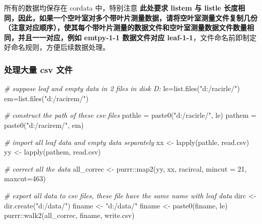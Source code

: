\documentclass[
]{krantz}
\makeatletter
\newenvironment{Shaded}{\begin{snugshade}}{\end{snugshade}}
\newcommand{\AttributeTok}[1]{\textcolor[rgb]{0.77,0.63,0.00}{#1}}
\newcommand{\CommentTok}[1]{\textcolor[rgb]{0.56,0.35,0.01}{\textit{#1}}}
\newcommand{\DecValTok}[1]{\textcolor[rgb]{0.00,0.00,0.81}{#1}}
\newcommand{\FunctionTok}[1]{\textcolor[rgb]{0.00,0.00,0.00}{#1}}
\newcommand{\NormalTok}[1]{#1}
\newcommand{\OtherTok}[1]{\textcolor[rgb]{0.56,0.35,0.01}{#1}}
\newcommand{\SpecialCharTok}[1]{\textcolor[rgb]{0.00,0.00,0.00}{#1}}
\newcommand{\StringTok}[1]{\textcolor[rgb]{0.31,0.60,0.02}{#1}}
\newenvironment{kframe}{%
\medskip{}
\setlength{\fboxsep}{.8em}
 \def\at@end@of@kframe{}%
 \ifinner\ifhmode%
  \def\at@end@of@kframe{\end{minipage}}%
  \begin{minipage}{\columnwidth}%
 \fi\fi%
 \def\FrameCommand##1{\hskip\@totalleftmargin \hskip-\fboxsep
 \colorbox{shadecolor}{##1}\hskip-\fboxsep
     \hskip-\linewidth \hskip-\@totalleftmargin \hskip\columnwidth}%
 \MakeFramed {\advance\hsize-\width
   \@totalleftmargin\z@ \linewidth\hsize
   \@setminipage}}%
 {\par\unskip\endMakeFramed%
 \at@end@of@kframe}
\renewenvironment{Shaded}{\begin{kframe}}{\end{kframe}}
\makeatother
\begin{document}
所有的数据均保存在 cordata 中，特别注意 \textbf{此处要求 listem 与 listle 长度相同，因此，如果一个空叶室对多个带叶片测量数据，请将空叶室测量文件复制几份（注意对应顺序），使其每个带叶片测量的数据文件和空叶室测量数据文件数量相同，并且一一对应，例如 emtpy-1-1 数据文件对应 leaf-1-1}，文件命名前即制定好命名规则，方便后续数据处理。

\hypertarget{imbycsv}{%
\subsubsection{处理大量 csv 文件}\label{imbycsv}}

\begin{Shaded}
\begin{Highlighting}[]
\CommentTok{\# suppose leaf and empty data in 2 files in disk D:}
\NormalTok{le}\OtherTok{=}\FunctionTok{list.files}\NormalTok{(}\StringTok{"d:/racirle/"}\NormalTok{)}
\NormalTok{em}\OtherTok{=}\FunctionTok{list.files}\NormalTok{(}\StringTok{"d:/racirem/"}\NormalTok{)}

\CommentTok{\# construct the path of these csv files}
\NormalTok{pathle }\OtherTok{=} \FunctionTok{paste0}\NormalTok{(}\StringTok{"d:/racirle/"}\NormalTok{, le)}
\NormalTok{pathem }\OtherTok{=} \FunctionTok{paste0}\NormalTok{(}\StringTok{"d:/racirem/"}\NormalTok{, em)}

\CommentTok{\# import all leaf data and empty data separately}
\NormalTok{xx }\OtherTok{\textless{}{-}} \FunctionTok{lapply}\NormalTok{(pathle, read.csv)}
\NormalTok{yy }\OtherTok{\textless{}{-}} \FunctionTok{lapply}\NormalTok{(pathem, read.csv)}

\CommentTok{\# correct all the data}
\NormalTok{all\_correc }\OtherTok{\textless{}{-}}\NormalTok{ purrr}\SpecialCharTok{::}\FunctionTok{map2}\NormalTok{(yy, xx, racircal, }\AttributeTok{mincut =} \DecValTok{21}\NormalTok{, }\AttributeTok{maxcut=}\DecValTok{463}\NormalTok{)}

\CommentTok{\#  export all data to csv files, these file have the same name with leaf data}
\NormalTok{dirc }\OtherTok{\textless{}{-}} \FunctionTok{dir.create}\NormalTok{(}\StringTok{"d:/data/"}\NormalTok{)}
\NormalTok{finame }\OtherTok{\textless{}{-}} \StringTok{"d:/data/"}
\NormalTok{finame }\OtherTok{\textless{}{-}} \FunctionTok{paste0}\NormalTok{(finame, le)}
\NormalTok{purrr}\SpecialCharTok{::}\FunctionTok{walk2}\NormalTok{(all\_correc,  finame, write.csv)}
\end{Highlighting}
\end{Shaded}
\end{document}
